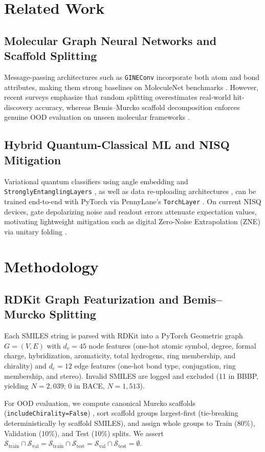 \documentclass[conference]{IEEEtran}
\begin{document}
\section{Related Work}
\subsection{Molecular Graph Neural Networks and Scaffold Splitting}
Message-passing architectures such as \texttt{GINEConv} \cite{hu2020strategies} incorporate both atom and bond attributes, making them strong baselines on MoleculeNet benchmarks \cite{wu2018moleculenet}. However, recent surveys emphasize that random splitting overestimates real-world hit-discovery accuracy, whereas Bemis--Murcko scaffold decomposition \cite{bemis1996properties} enforces genuine OOD evaluation on unseen molecular frameworks \cite{molsurvey2026}.

\subsection{Hybrid Quantum-Classical ML and NISQ Mitigation}
Variational quantum classifiers using angle embedding and \texttt{StronglyEntanglingLayers} \cite{schuld2020circuit}, as well as data re-uploading architectures \cite{perez2020data}, can be trained end-to-end with PyTorch via PennyLane's \texttt{TorchLayer} \cite{bergholm2018pennylane}. On current NISQ devices, gate depolarizing noise and readout errors attenuate expectation values, motivating lightweight mitigation such as digital Zero-Noise Extrapolation (ZNE) via unitary folding \cite{temme2017error,giurgica2020digital}.

\section{Methodology}
\subsection{RDKit Graph Featurization and Bemis--Murcko Splitting}
Each SMILES string is parsed with RDKit into a PyTorch Geometric graph $G=(V,E)$ with $d_v = 45$ node features (one-hot atomic symbol, degree, formal charge, hybridization, aromaticity, total hydrogens, ring membership, and chirality) and $d_e = 12$ edge features (one-hot bond type, conjugation, ring membership, and stereo). Invalid SMILES are logged and excluded (11 in BBBP, yielding $N=2{,}039$; 0 in BACE, $N=1{,}513$).

For OOD evaluation, we compute canonical Murcko scaffolds (\texttt{includeChirality=False}) \cite{bemis1996properties}, sort scaffold groups largest-first (tie-breaking deterministically by scaffold SMILES), and assign whole groups to Train (80\%), Validation (10\%), and Test (10\%) splits. We assert $\mathcal{S}_{\text{train}} \cap \mathcal{S}_{\text{val}} = \mathcal{S}_{\text{train}} \cap \mathcal{S}_{\text{test}} = \mathcal{S}_{\text{val}} \cap \mathcal{S}_{\text{test}} = \emptyset$.
\end{document}
